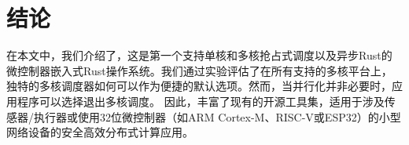 


\section{结论}
在本文中，我们介绍了\OSname{}，这是第一个支持单核和多核抢占式调度以及异步Rust的微控制器嵌入式Rust操作系统。我们通过实验评估了在所有支持的多核平台上，独特的多核调度器如何可以作为便捷的默认选项。然而，当并行化并非必要时，应用程序可以选择退出多核调度。
因此，\OSname{}丰富了现有的开源工具集，适用于涉及传感器/执行器或使用32位微控制器（如ARM Cortex\nobreakdash-M、RISC\nobreakdash-V或ESP32）的小型网络设备的安全高效分布式计算应用。



